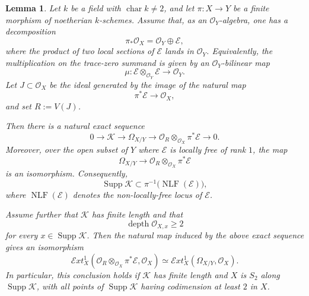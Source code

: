 \documentclass[11pt,twoside]{amsart}
\theoremstyle{plain}
\numberwithin{equation}{section}
\newtheorem{lemma}[theorem]{Lemma}
\theoremstyle{definition}
\begin{document}
\begin{lemma}\label{lem:omega-double-cover-trace-zero}
Let $k$ be a field with $\operatorname{char}k\neq 2$, and let $\pi:X\to Y$ be a finite morphism of noetherian $k$-schemes. Assume that, as an $\mathcal{O}_Y$-algebra, one has a decomposition
$$
\pi_{*}\mathcal{O}_X=\mathcal{O}_Y\oplus\mathcal{E},
$$
where the product of two local sections of $\mathcal{E}$ lands in $\mathcal{O}_Y$. Equivalently, the multiplication on the trace-zero summand is given by an $\mathcal{O}_Y$-bilinear map
$$
\mu:\mathcal{E}\otimes_{\mathcal{O}_Y}\mathcal{E}\longrightarrow\mathcal{O}_Y.
$$
Let $J\subset\mathcal{O}_X$ be the ideal generated by the image of the natural map
$$
\pi^*\mathcal{E}\longrightarrow\mathcal{O}_X,
$$
and set $R:=V(J)$.

Then there is a natural exact sequence
$$
0\longrightarrow\mathcal{K}\longrightarrow\Omega_{X/Y}
\longrightarrow
\mathcal{O}_R\otimes_{\mathcal{O}_X}\pi^*\mathcal{E}
\longrightarrow 0.
$$
Moreover, over the open subset of $Y$ where $\mathcal{E}$ is locally free of rank $1$, the map
$$
\Omega_{X/Y}
\longrightarrow
\mathcal{O}_R\otimes_{\mathcal{O}_X}\pi^*\mathcal{E}
$$
is an isomorphism. Consequently,
$$
\operatorname{Supp}\mathcal{K}
\subset
\pi^{-1}\bigl(\operatorname{NLF}(\mathcal{E})\bigr),
$$
where $\operatorname{NLF}(\mathcal{E})$ denotes the non-locally-free locus of $\mathcal{E}$.

Assume further that $\mathcal{K}$ has finite length and that
$$
\operatorname{depth}\mathcal{O}_{X,x}\geq 2
$$
for every $x\in\operatorname{Supp}\mathcal{K}$. Then the natural map induced by the above exact sequence gives an isomorphism
$$
\mathcal{E}xt_X^1
\left(
\mathcal{O}_R\otimes_{\mathcal{O}_X}\pi^*\mathcal{E},
\mathcal{O}_X
\right)
\simeq
\mathcal{E}xt_X^1(\Omega_{X/Y},\mathcal{O}_X).
$$
In particular, this conclusion holds if $\mathcal{K}$ has finite length and $X$ is $S_2$ along $\operatorname{Supp}\mathcal{K}$, with all points of $\operatorname{Supp}\mathcal{K}$ having codimension at least $2$ in $X$.
\end{lemma}
\end{document}
